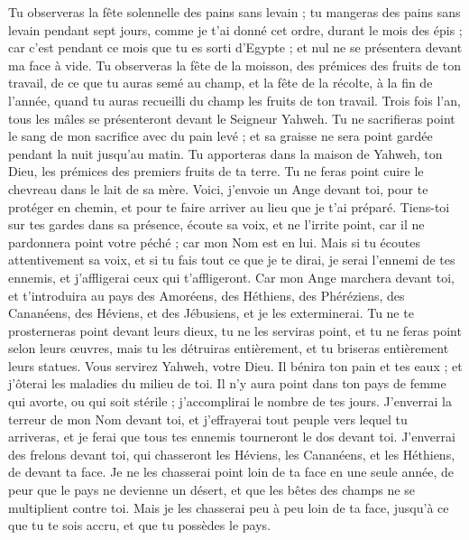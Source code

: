 \begin{multicols}{2}
Tu observeras la fête solennelle des pains sans levain ; tu mangeras des pains sans levain pendant sept jours, comme je t'ai donné cet ordre, durant le mois des épis ; car c’est pendant ce mois que tu es sorti d'Egypte ; et nul ne se présentera devant ma face à vide.
Tu observeras la fête de la moisson, des prémices des fruits de ton travail, de ce que tu auras semé au champ, et la fête de la récolte, à la fin de l'année, quand tu auras recueilli du champ les fruits de ton travail.
Trois fois l'an, tous les mâles se présenteront devant le Seigneur Yahweh.
Tu ne sacrifieras point le sang de mon sacrifice avec du pain levé ; et sa graisse ne sera point gardée pendant la nuit jusqu’au matin.
Tu apporteras dans la maison de Yahweh, ton Dieu, les prémices des premiers fruits de ta terre. Tu ne feras point cuire le chevreau dans le lait de sa mère.
Voici, j'envoie un Ange devant toi, pour te protéger en chemin, et pour te faire arriver au lieu que je t'ai préparé.
Tiens-toi sur tes gardes dans sa présence, écoute sa voix, et ne l'irrite point, car il ne pardonnera point votre péché ; car mon Nom est en lui.
Mais si tu écoutes attentivement sa voix, et si tu fais tout ce que je te dirai, je serai l'ennemi de tes ennemis, et j'affligerai ceux qui t'affligeront.
Car mon Ange marchera devant toi, et t'introduira au pays des Amoréens, des Héthiens, des Phéréziens, des Cananéens, des Héviens, et des Jébusiens, et je les exterminerai.
Tu ne te prosterneras point devant leurs dieux, tu ne les serviras point, et tu ne feras point selon leurs œuvres, mais tu les détruiras entièrement, et tu briseras entièrement leurs statues.
Vous servirez Yahweh, votre Dieu. Il bénira ton pain et tes eaux ; et j'ôterai les maladies du milieu de toi.
Il n'y aura point dans ton pays de femme qui avorte, ou qui soit stérile ; j'accomplirai le nombre de tes jours.
J'enverrai la terreur de mon Nom devant toi, et j'effrayerai tout peuple vers lequel tu arriveras, et je ferai que tous tes ennemis tourneront le dos devant toi.
J'enverrai des frelons devant toi, qui chasseront les Héviens, les Cananéens, et les Héthiens, de devant ta face.
Je ne les chasserai point loin de ta face en une seule année, de peur que le pays ne devienne un désert, et que les bêtes des champs ne se multiplient contre toi.
Mais je les chasserai peu à peu loin de ta face, jusqu'à ce que tu te sois accru, et que tu possèdes le pays.

\end{multicols}
